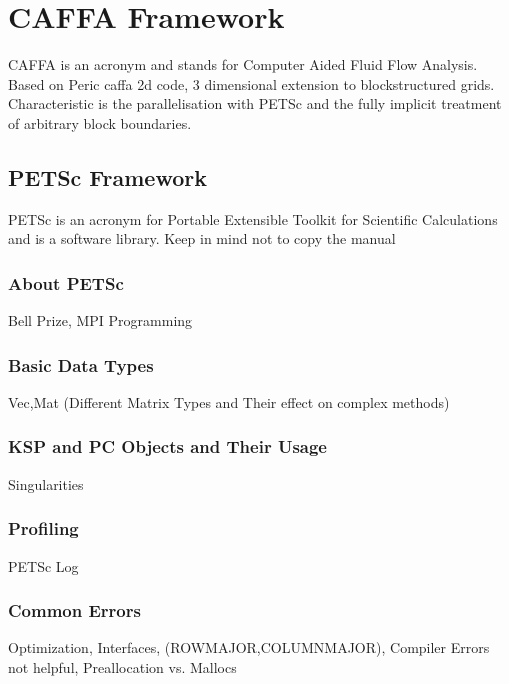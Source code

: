   \section{CAFFA Framework}

  CAFFA is an acronym and stands for Computer Aided Fluid Flow Analysis. Based on Peric caffa 2d code, 3 dimensional extension to blockstructured grids. Characteristic is the parallelisation with PETSc and the fully implicit treatment of arbitrary block boundaries.

    \subsection{PETSc Framework}

        PETSc is an acronym for Portable Extensible Toolkit for Scientific Calculations and is a software library.
        Keep in mind not to copy the manual

      \subsubsection{About PETSc}

        Bell Prize, MPI Programming

      \subsubsection{Basic Data Types}

        Vec,Mat (Different Matrix Types and Their effect on complex methods)

      \subsubsection{KSP and PC Objects and Their Usage}

        Singularities

      \subsubsection{Profiling}

        PETSc Log 

      \subsubsection{Common Errors}

      Optimization, Interfaces, (ROWMAJOR,COLUMNMAJOR), Compiler Errors not helpful, Preallocation vs. Mallocs

